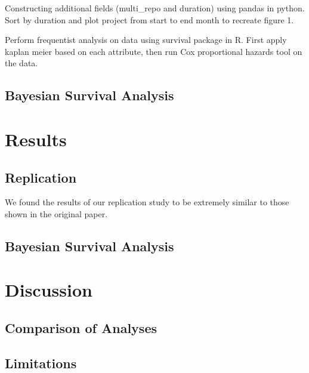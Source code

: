 \documentclass[acmconf]{acmart}
\begin{document}
Constructing additional fields (multi\_repo and duration) using pandas in python. Sort by duration and plot project from start to end month to recreate figure 1.

Perform frequentist analysis on data using survival package in R. First apply kaplan meier based on each attribute, then run Cox proportional hazards tool on the data.

\subsection{Bayesian Survival Analysis}


\section{Results}

\subsection{Replication}

We found the results of our replication study to be extremely similar to those shown in the original paper.




\subsection{Bayesian Survival Analysis}


\section{Discussion}

\subsection{Comparison of Analyses}

\subsection{Limitations}
\end{document}
